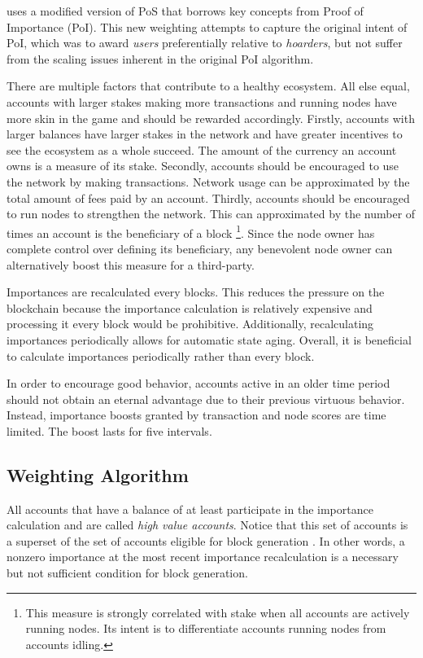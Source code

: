 \codenamespace uses a modified version of PoS that borrows key concepts from Proof of Importance (PoI).
This new weighting attempts to capture the original intent of PoI, which was to award \emph{users} preferentially relative to \emph{hoarders}, but not suffer from the scaling issues inherent in the original PoI algorithm.

There are multiple factors that contribute to a healthy ecosystem.
All else equal, accounts with larger stakes making more transactions and running nodes have more skin in the game and should be rewarded accordingly.
Firstly, accounts with larger balances have larger stakes in the network and have greater incentives to see the ecosystem as a whole succeed.
The amount of the currency an account owns is a measure of its stake.
Secondly, accounts should be encouraged to use the network by making transactions.
Network usage can be approximated by the total amount of fees paid by an account.
Thirdly, accounts should be encouraged to run nodes to strengthen the network.
This can approximated by the number of times an account is the beneficiary of a block
\footnote{
	This measure is strongly correlated with stake when all accounts are actively running nodes.
	Its intent is to differentiate accounts running nodes from accounts idling.
}.
Since the node owner has complete control over defining its beneficiary, any benevolent node owner can alternatively boost this measure for a third-party.

Importances are recalculated every  blocks.
This reduces the pressure on the blockchain because the importance calculation is relatively expensive and processing it every block would be prohibitive.
Additionally, recalculating importances periodically allows for automatic state aging.
Overall, it is beneficial to calculate importances periodically rather than every block.

In order to encourage good behavior, accounts active in an older time period should not obtain an eternal advantage due to their previous virtuous behavior.
Instead, importance boosts granted by transaction and node scores are time limited.
The boost lasts for five  intervals.

\subsection{Weighting Algorithm}
\label{sec:consensus:weighting}

All accounts that have a balance of at least  participate in the importance calculation and are called \emph{high value accounts}.
Notice that this set of accounts is a superset of the set of accounts eligible for block generation .
In other words, a nonzero importance at the most recent importance recalculation is a necessary but not sufficient condition for block generation.

